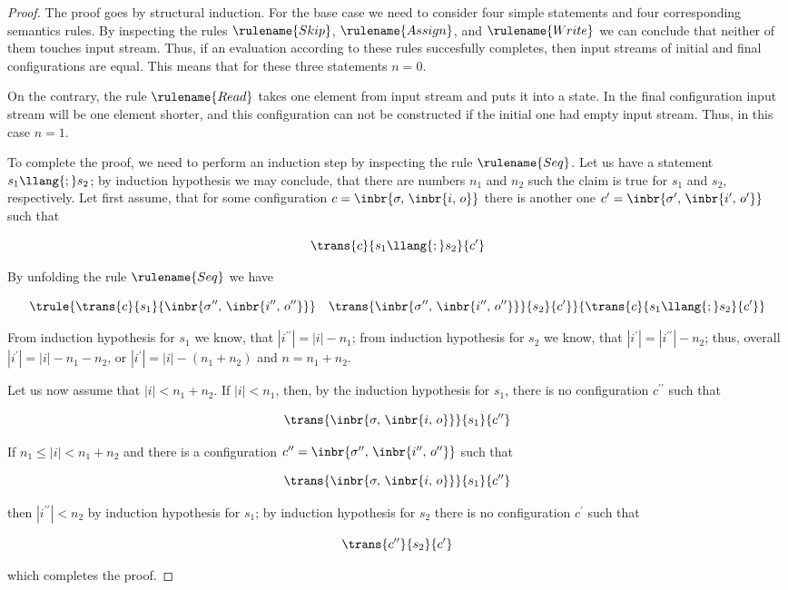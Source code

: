 \begin{proof}
The proof goes by structural induction. For the base case we need to consider four simple statements and four corresponding semantics rules.
By inspecting the rules $\rulename{Skip}$, $\rulename{Assign}$, and $\rulename{Write}$ we can conclude that neither of them touches input stream. Thus,
if an evaluation according to these rules succesfully completes, then input streams of initial and final configurations are equal. This means that for these
three statements $n=0$.

On the contrary, the rule $\rulename{Read}$ takes one element from input stream and puts it into a state. In the final configuration input stream will be one
element shorter, and this configuration can not be constructed if the initial one had empty input stream. Thus, in this case $n=1$.

To complete the proof, we need to perform an induction step by inspecting the rule $\rulename{Seq}$. Let us have a statement $s_1\llang{;}s_2$; by
induction hypothesis we may conclude, that there are numbers $n_1$ and $n_2$ such the claim is true for $s_1$ and $s_2$, respectively. Let first
assume, that for some configuration $c=\inbr{\sigma,\,\inbr{i,\,o}}$ there is another one $c^\prime=\inbr{\sigma^\prime,\,\inbr{i^\prime,\,o^\prime}}$ such that

\[
\trans{c}{s_1\llang{;}s_2}{c^\prime}
\]

By unfolding the rule $\rulename{Seq}$ we have


\[
\trule{\trans{c}{s_1}{\inbr{\sigma^{\prime\prime},\,\inbr{i^{\prime\prime},\,o^{\prime\prime}}}}\quad\trans{\inbr{\sigma^{\prime\prime},\,\inbr{i^{\prime\prime},\,o^{\prime\prime}}}}{s_2}{c^\prime}}
      {\trans{c}{s_1\llang{;}s_2}{c^\prime}}
\]

From induction hypothesis for $s_1$ we know, that $|i^{\prime\prime}|=|i|-n_1$; from induction hypothesis for $s_2$ we know, that $|i^\prime|=|i^{\prime\prime}|-n_2$; thus, overall
$|i^\prime|=|i|-n_1-n_2$, or $|i^\prime|=|i|-(n_1+n_2)$ and $n=n_1+n_2$.

Let us now assume that $|i|<n_1+n_2$. If $|i|<n_1$, then, by the induction hypothesis for $s_1$, there is no configuration $c^{\prime\prime}$ such that

\[
\trans{\inbr{\sigma,\,\inbr{i,\,o}}}{s_1}{c^{\prime\prime}}
\]

If $n_1\le|i|<n_1+n_2$ and there is a configuration $c^{\prime\prime}=\inbr{\sigma^{\prime\prime},\,\inbr{i^{\prime\prime},\,o^{\prime\prime}}}$ such that

\[
\trans{\inbr{\sigma,\,\inbr{i,\,o}}}{s_1}{c^{\prime\prime}}
\]

then $|i^{\prime\prime}|<n_2$ by induction hypothesis for $s_1$; by induction hypothesis for $s_2$ there is no configuration $c^\prime$ such that

\[
\trans{c^{\prime\prime}}{s_2}{c^\prime}
\]

which completes the proof.
\end{proof}


